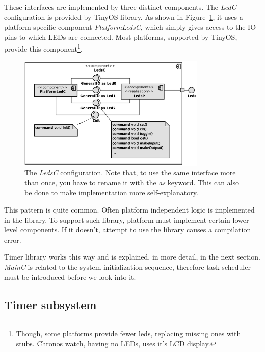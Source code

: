 These interfaces are implemented by three distinct components.
The \emph{LedC} configuration is provided by TinyOS library.
As shown in Figure~\ref{fig:ledc}, it uses a platform specific component
\emph{PlatformLedsC}, which simply gives access to the IO pins to
which LEDs are connected. Most platforms, supported by TinyOS, provide
this component\footnote{Though, some platforms provide fewer leds,
replacing missing ones with stubs. Chronos watch, having no LEDs,
uses it's LCD display.}.
\begin{figure}[h]
  \centering
  \includegraphics[width=0.8\textwidth]{diagrams/ledsc.eps}
  \caption{The \emph{LedsC} configuration. Note that, to use the same
  interface more than once, you have to rename it with the \emph{as}
  keyword.  This can also be done to make implementation more
  self-explanatory.}
  \label{fig:ledc}
\end{figure}

This pattern is quite common. Often platform independent logic is
implemented in the library. To support such library, platform must
implement certain lower level components.  If it doesn't, attempt to
use the library causes a compilation error.

Timer library works this way and is explained, in more detail, in the
next section. \emph{MainC} is related to the system initialization
sequence, therefore task scheduler must be introduced before we look into
it.

\subsection{Timer subsystem}

